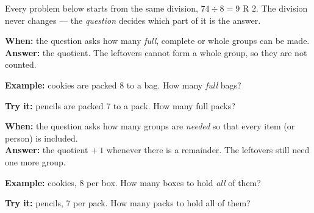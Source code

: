 \documentclass[12pt]{article}
\begin{document}

\noindent\small Every problem below starts from the same division,
$74 \div 8 = 9$ R $2$. The division never changes --- the \emph{question} decides
which part of it is the answer.\normalsize

\begin{formulabox}\textbf{When:} the question asks how many \emph{full}, complete or
whole groups can be made.\\[3pt]
\textbf{Answer:} the quotient. The leftovers cannot form a whole group, so they are not counted.
\end{formulabox}
\begin{examplebox}\textbf{Example:} cookies are packed 8 to a bag. How many \emph{full} bags?
\end{examplebox}
\begin{tryitbox}\textbf{Try it:} pencils are packed 7 to a pack. How many full packs?\\[2pt]
\end{tryitbox}

\begin{formulabox}\textbf{When:} the question asks how many groups are \emph{needed} so that
every item (or person) is included.\\[3pt]
\textbf{Answer:} the quotient $+\ 1$ whenever there is a remainder. The leftovers still need one more group.
\end{formulabox}
\begin{examplebox}\textbf{Example:} cookies, 8 per box. How many boxes to hold \emph{all} of them?
\end{examplebox}
\begin{tryitbox}\textbf{Try it:} pencils, 7 per pack. How many packs to hold all of them?\\[2pt]
\end{tryitbox}
\end{document}
